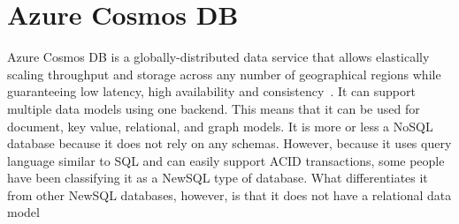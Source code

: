 \section{Azure Cosmos DB}


Azure Cosmos DB is a globally-distributed data service that allows elastically
scaling throughput and storage across any number of geographical regions while
guaranteeing low latency, high availability and consistency~\cite{hid-sp18-501-CosmosDB}. It
can support multiple data models using one backend. This means that it can be
used for document, key value, relational, and graph models. It is more or less a
NoSQL database because it does not rely on any schemas. However, because it uses
query language similar to SQL and can easily support ACID transactions, some
people have been classifying it as a NewSQL type of database. What
differentiates it from other NewSQL databases, however, is that it does not have
a relational data model~\cite{hid-sp18-501-Stackify}

